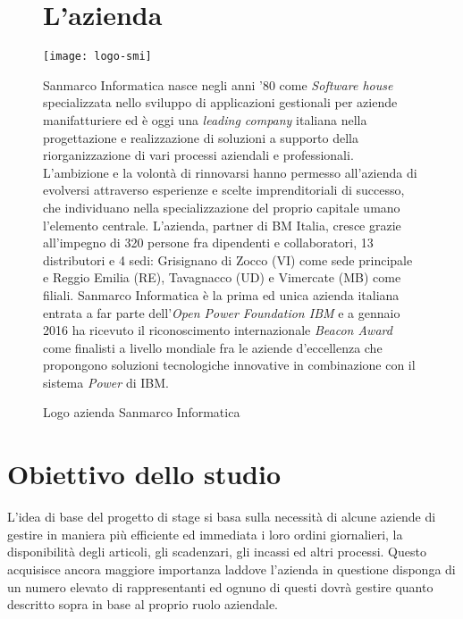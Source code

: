 \begin{figure}[h!]
\section{L'azienda}
   \begin{center}
    \texttt{[image: logo-smi]}
    \caption{Logo azienda Sanmarco Informatica}
    \end{center}
    Sanmarco Informatica nasce negli anni '80 come \textit{Software house} specializzata nello sviluppo di applicazioni gestionali per aziende manifatturiere ed è oggi una \textit{leading company} italiana nella progettazione e realizzazione di soluzioni a supporto della riorganizzazione di vari processi aziendali e professionali. L'ambizione e la volontà di rinnovarsi hanno permesso all'azienda di evolversi attraverso esperienze  e scelte imprenditoriali di successo, che individuano nella specializzazione del proprio capitale umano l'elemento centrale. L'azienda, partner di BM Italia, cresce grazie all'impegno di 320 persone fra dipendenti e collaboratori, 13 distributori e 4 sedi: Grisignano di Zocco (VI) come sede principale e Reggio Emilia (RE), Tavagnacco (UD) e Vimercate (MB) come filiali.
Sanmarco Informatica è la prima ed unica azienda italiana entrata a far parte dell'\textit{\gls{Open Power Foundation IBM}} e a gennaio 2016 ha ricevuto il riconoscimento internazionale \textit{Beacon Award} come finalisti a livello mondiale fra le aziende d'eccellenza che propongono soluzioni tecnologiche innovative in combinazione con il sistema \textit{Power} di IBM.

    \end{figure}
    







\section{Obiettivo dello studio}



L'idea di base del progetto di stage si basa sulla necessità di alcune aziende di gestire in maniera più efficiente ed immediata i loro ordini giornalieri, la disponibilità degli articoli, gli scadenzari, gli incassi ed altri processi. Questo acquisisce ancora maggiore importanza laddove l'azienda in questione disponga di un numero elevato di rappresentanti ed ognuno di questi dovrà gestire quanto descritto sopra in base al proprio ruolo aziendale. 

